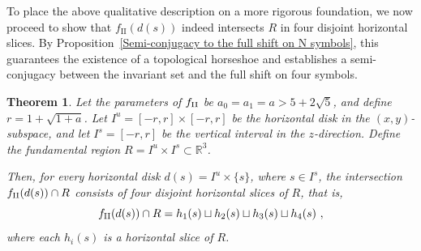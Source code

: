 \documentclass[12pt]{iopart}
\newtheorem{theorem}{Theorem}[section]
\begin{document}
To place the above qualitative description on a more rigorous foundation, we now proceed to show that \( f_{\mathrm{II}}(d(s)) \) indeed intersects \( R \) in four disjoint horizontal slices. By Proposition~\ref{Semi-conjugacy to the full shift on N symbols}, this guarantees the existence of a topological horseshoe and establishes a semi-conjugacy between the invariant set and the full shift on four symbols.

\begin{theorem}\label{3D Doubly folded horseshoe topology}
Let the parameters of \( f_{\rm II} \) be \( a_0 = a_1 = a > 5 + 2\sqrt{5} \), and define \( r = 1 + \sqrt{1 + a} \). Let \( I^u = [-r, r] \times [-r, r] \) be the horizontal disk in the \( (x, y) \)-subspace, and let \( I^s = [-r, r] \) be the vertical interval in the \( z \)-direction. Define the fundamental region \( R = I^u \times I^s \subset \mathbb{R}^3 \).

Then, for every horizontal disk \( d(s) = I^u \times \{ s \} \), where \( s \in I^s \), the intersection \( f_{\rm II}(d(s)) \cap R \) consists of four disjoint horizontal slices of \( R \), that is,
\begin{equation}
f_{\rm II}(d(s)) \cap R = h_1(s) \sqcup h_2(s) \sqcup h_3(s) \sqcup h_4(s)\ ,
\end{equation}
where each \( h_i(s) \) is a horizontal slice of \( R \).
\end{theorem}
\end{document}
